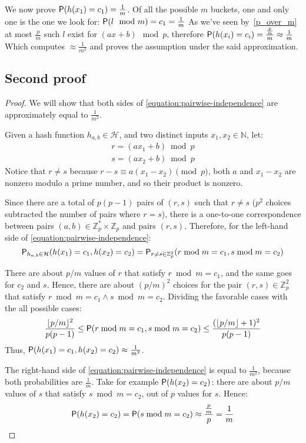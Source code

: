 We now prove $\mathsf{P}(h(x_{1}) = c_{1}) = \frac{1}{m}$.
Of all the possible $m$ buckets, one and only one is the one we look for:
$\mathsf{P}(l \mod m) = c_{1} = \frac{1}{m}$
As we've seen by~\ref{p_over_m} at most $\frac{p}{m}$ such $l$ exist for $(a x + b) \mod p$,
therefore $\mathsf{P}(h(x_i) = c_{i}) = \frac{\frac{p}{m}}{m} \approx \frac{1}{m}$
Which computes $\approx \frac{1}{m^{2}}$ and proves the assumption under the said approximation.

\subsection{Second proof}

\begin{proof}
We will show that both sides of  \eqref{equation:pairwise-independence} are approximately equal to $\frac{1}{m^2}$.

Given a hash function $h_{a,b} \in \mathcal{H}$, and two distinct inputs $x_1, x_2 \in \mathbb{N}$, let:
\begin{align*}
  r = (a x_1 + b) \bmod p\\
  s = (a x_2 + b) \bmod p
\end{align*}
Notice that $r \ne s$ because $r - s \equiv a(x_1-x_2) \pmod p $,  both $a$ and $x_1-x_2$ are nonzero modulo a prime number, and so their product is nonzero.

Since there are a total of $p(p-1)$ pairs of $(r, s)$ such that $r \ne s$ ($p^2$ choices subtracted the number of pairs where $r=s$), there is a one-to-one correspondence between pairs $(a, b)\in \mathbb{Z}_p^*\times\mathbb{Z}_p$ and pairs $(r, s)$. Therefore, for the left-hand side of \eqref{equation:pairwise-independence}:
$$\mathsf{P}_{h_{a,b}\in\mathcal{H}}(h(x_1)= c_1, h(x_2) = c_2) = \mathsf{P}_{r\ne s\in\mathbb{Z}_p^2}(r \bmod m = c_1, s \bmod m = c_2)$$

There are about $p / m$ values of $r$ that satisfy $r \bmod m=c_1$, and the same goes for $c_2$ and $s$. Hence, there are about $(p / m)^2$ choices for the pair $(r, s) \in \mathbb{Z}_p^2$ that satisfy $r \bmod m = c_1 \wedge s \bmod m = c_2$. Dividing the favorable cases with the all possible cases:
$$\frac{\lfloor p / m \rfloor^2}{p(p-1)}\le\mathsf{P}(r \bmod m = c_1, s \bmod m = c_2)\le \frac{(\lfloor p / m \rfloor + 1)^2}{p(p-1)}$$
Thus, $\mathsf{P}(h(x_1)= c_1, h(x_2) = c_2)\approx \frac{1}{m^2}$.

\vspace{10pt}
The right-hand side of \eqref{equation:pairwise-independence} is equal to  $\frac{1}{m^2}$, because both probabilities are $\frac{1}{m}$. Take for example $\mathsf{P}(h(x_2) = c_2)$: there are about $p / m$ values of $s$ that satisfy $s \bmod m = c_2$, out of $p$ values for $s$. Hence:
$$\mathsf{P}(h(x_2) = c_2) = \mathsf{P}(s \bmod m = c_2) \approx \frac{\frac{p}{m}}{p} = \frac{1}{m}$$


\end{proof}